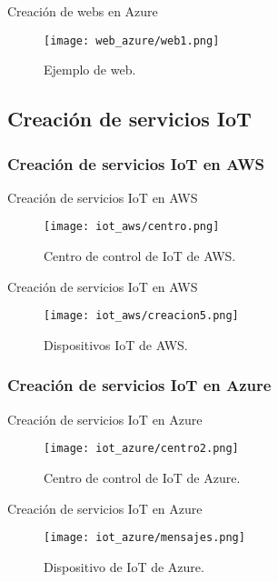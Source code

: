 \documentclass[aspectratio=169]{beamer}
\begin{document}
\begin{frame}{Creación de webs en Azure}
\begin{figure}[h]
	\centering
	\texttt{[image: web\_azure/web1.png]}
	\caption{Ejemplo de web.}
	\label{Ejemplo de web}
\end{figure}
\end{frame}

\subsection{Creación de servicios IoT}
\subsubsection{Creación de servicios IoT en AWS}
\begin{frame}{Creación de servicios IoT en AWS}
	\begin{figure}[h]
		\centering
		\texttt{[image: iot\_aws/centro.png]}
		\caption{Centro de control de IoT de AWS.}
		\label{Centro de control de IoT de AWS}
	\end{figure}
\end{frame}

\begin{frame}{Creación de servicios IoT en AWS}
\begin{figure}[h]
	\centering
	\texttt{[image: iot\_aws/creacion5.png]}
	\caption{Dispositivos IoT de AWS.}
	\label{Dispositivo IoT de AWS}
\end{figure}
\end{frame}

\subsubsection{Creación de servicios IoT en Azure}
\begin{frame}{Creación de servicios IoT en Azure}
\begin{figure}[h]
	\centering
	\texttt{[image: iot\_azure/centro2.png]}
	\caption{Centro de control de IoT de Azure.}
	\label{Centro de control de IoT de Azure}
\end{figure}
\end{frame}

\begin{frame}{Creación de servicios IoT en Azure}
\begin{figure}[h]
	\centering
	\texttt{[image: iot\_azure/mensajes.png]}
	\caption{Dispositivo de IoT de Azure.}
	\label{Dispositivo de IoT de Azure}
\end{figure}
\end{frame}
\end{document}
